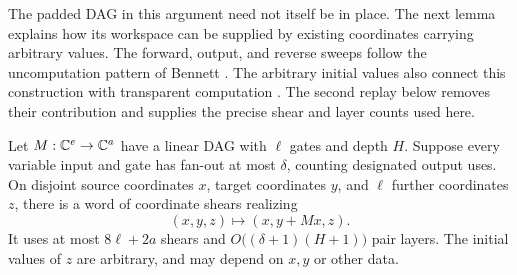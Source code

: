 The padded DAG in this argument need not itself be in place.  The next
lemma explains how its workspace can be supplied by existing
coordinates carrying arbitrary values.
The forward, output, and reverse sweeps follow the uncomputation pattern
of Bennett \citep{bennett1973}. The arbitrary initial values also connect
this construction with transparent computation
\citep[Section~3]{buhrmanEtAl2014}. The second replay below removes their
contribution and supplies the precise shear and layer counts used here.

\begin{samepage}
\begin{lemma}\label{fft:dirty-layers}
Let $M:\mathbb C^e\to\mathbb C^a$ have a linear DAG with $\ell$ gates and depth $H$.
Suppose every variable input and gate has fan-out at most $\delta$,
counting designated output uses.  On disjoint source coordinates $x$,
target coordinates $y$, and $\ell$ further coordinates $z$, there is a
word of coordinate shears realizing
\[
 (x,y,z)\longmapsto(x,y+Mx,z).
\]
It uses at most $8\ell+2a$ shears and
$O\bigl((\delta+1)(H+1)\bigr)$ pair layers.  The initial values of $z$
are arbitrary, and may depend on $x,y$ or other data.
\end{lemma}
\end{samepage}

